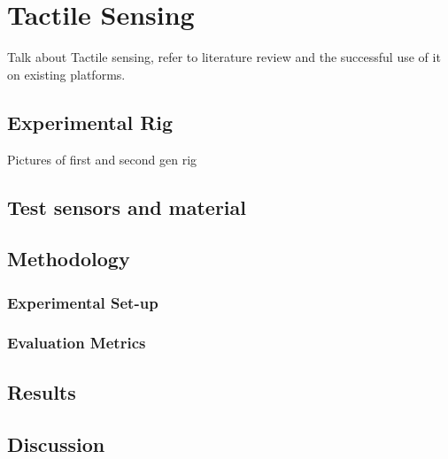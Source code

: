 \chapter{Tactile Sensing}
Talk about Tactile sensing, refer to literature review and the successful use of it on existing platforms.

\section{Experimental Rig}
Pictures of first and second gen rig

\section{Test sensors and material}

\section{Methodology}
\subsection{Experimental Set-up}
\subsection{Evaluation Metrics}


\section{Results}


\section{Discussion}






